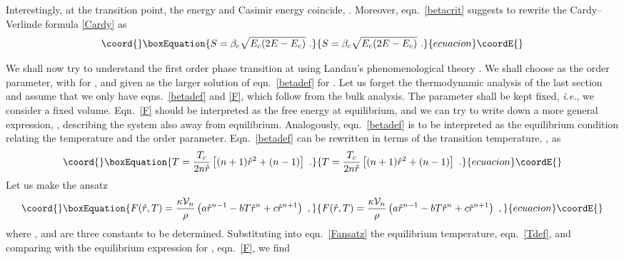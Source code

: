 \documentclass[a4paper,12pt]{article}
\begin{document}
Interestingly, at the transition point, the energy and
Casimir energy coincide, \coordHE{}. Moreover, eqn.\ \eqref{betacrit}
suggests to rewrite the Cardy--Verlinde formula \eqref{Cardy} as
\begin{equation}\coord{}\boxEquation{
\label{Cardy2}
  S = \beta_c \sqrt{E_c(2E-E_c)}~.
}{
S = \beta_c \sqrt{E_c(2E-E_c)}~.
}{ecuacion}\coordE{}\end{equation}


We shall now try to understand the first order phase transition at
\coordHE{} using Landau's phenomenological theory
\cite{Landau9}. We shall choose \myHighlight{$\rh$}\coordHE{}
as the order parameter, with \coordHE{} for \coordHE{}, and \myHighlight{$\rh$}\coordHE{} given as
the larger solution of eqn.\ \eqref{betadef} for \coordHE{}. Let us
forget the thermodynamic analysis of the last section
and assume that we only have eqns.\ \eqref{betadef} and \eqref{F}, which
follow from the bulk analysis. The parameter \myHighlight{$\rho$}\coordHE{} shall be kept
fixed, \emph{i.e.}, we consider a fixed volume.
Eqn.\ \eqref{F} should be interpreted as the free energy at
equilibrium, and we can try to write down a more general expression,
\coordHE{}, describing the system also away from
equilibrium. Analogously, eqn.\ \eqref{betadef} is to be interpreted
as the equilibrium condition relating the temperature and the order
parameter. Eqn.\ \eqref{betadef} can be rewritten in terms of the
transition temperature, \coordHE{}, as
\begin{equation}\coord{}\boxEquation{
\label{Tdef}
  T = \frac{T_c}{2n\rh} \left[(n+1) \rh^2 +(n-1) \right]~.
}{
T = \frac{T_c}{2n\rh} \left[(n+1) \rh^2 +(n-1) \right]~.
}{ecuacion}\coordE{}\end{equation}
Let us make the ansatz
\begin{equation}\coord{}\boxEquation{
\label{Fansatz}
  F(\rh,T) = \frac{\kappa \V_n}{\rho} \left( a \rh^{n-1} - bT \rh^n +c
  \rh^{n+1} \right)~,
}{
F(\rh,T) = \frac{\kappa \V_n}{\rho} \left( a \rh^{n-1} - bT \rh^n +c
  \rh^{n+1} \right)~,
}{ecuacion}\coordE{}\end{equation}
where \coordHE{}, \coordHE{} and \coordHE{} are three constants to be
determined. Substituting into eqn.\ \eqref{Fansatz} the equilibrium
temperature, eqn.\ \eqref{Tdef}, and comparing with
the equilibrium expression for \coordHE{}, eqn.\ \eqref{F}, we find
\end{document}
